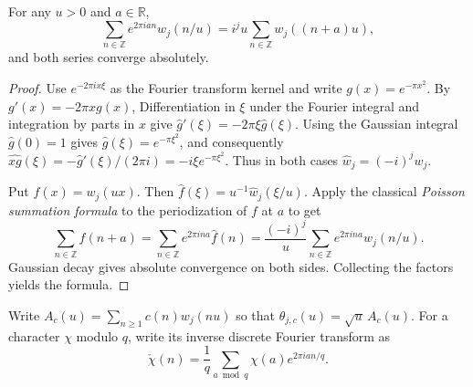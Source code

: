 \begin{lemma}
\label{lem:gaussian-poisson}
\emitthmsource
For any $u>0$ and $a\in\mathbb R$,
\[
 \sum_{n\in\mathbb Z} e^{2\pi ian}w_j(n/u)
   =i^j u\sum_{n\in\mathbb Z}w_j((n+a)u),
\]
and both series converge absolutely.
\end{lemma}
\begin{proof}
Use $e^{-2\pi i x\xi}$ as the Fourier transform kernel and write
$g(x)=e^{-\pi x^2}$. By $g'(x)=-2\pi xg(x)$,
Differentiation in $\xi$ under the Fourier integral and integration by parts in $x$ give
$\widehat g'(\xi)=-2\pi\xi\widehat g(\xi)$.
Using the Gaussian integral $\widehat g(0)=1$ gives $\widehat g(\xi)=e^{-\pi\xi^2}$,
and consequently $\widehat{xg}(\xi)=-\widehat g'(\xi)/(2\pi i)=-i\xi e^{-\pi\xi^2}$.
Thus in both cases $\widehat w_j=(-i)^jw_j$.

Put $f(x)=w_j(ux)$. Then $\widehat f(\xi)=u^{-1}\widehat w_j(\xi/u)$.
Apply the classical \emph{Poisson summation formula} to the periodization of $f$ at $a$ to get
\[
 \sum_{n\in\mathbb Z}f(n+a)
 = \sum_{n\in\mathbb Z}e^{2\pi ina}\widehat f(n)
 =\frac{(-i)^j}{u}\sum_{n\in\mathbb Z}e^{2\pi ina}w_j(n/u).
\]
Gaussian decay gives absolute convergence on both sides. Collecting the factors yields the formula.
\end{proof}

Write $A_c(u)=\sum_{n\ge1}c(n)w_j(nu)$ so that $\theta_{j,c}(u)=\sqrt u\,A_c(u)$.
For a character $\chi$ modulo $q$, write its inverse discrete Fourier transform as
\[
 \check\chi(n)=\frac1q\sum_{a\bmod q}\chi(a)e^{2\pi ian/q}.
\]

